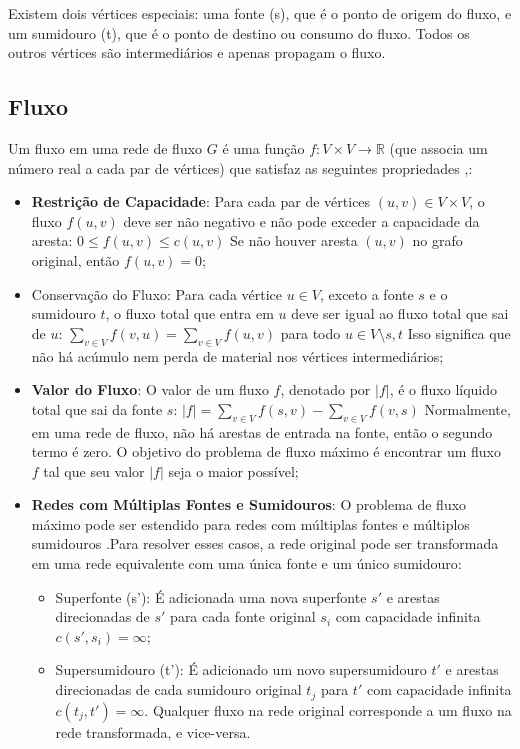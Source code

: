 \documentclass[12pt]{article}
\begin{document}
\noindent Existem dois vértices especiais: uma fonte (s), que é o ponto de origem do fluxo, e um sumidouro (t), que é o ponto de destino ou consumo do fluxo. Todos os outros vértices são intermediários e apenas propagam o fluxo.

\subsection{Fluxo} 

Um fluxo em uma rede de fluxo $G$ é uma função $f: V \times V \rightarrow \mathbb{R}$ (que associa um número real a cada par de vértices) que satisfaz as seguintes propriedades \cite{ahuja1993},:

\begin{itemize}
    \item \textbf{Restrição de Capacidade}: Para cada par de vértices $(u, v) \in V \times V$, o fluxo $f(u, v)$ deve ser não negativo e não pode exceder a capacidade da aresta: $0 \le f(u, v) \le c(u, v)$ Se não houver aresta $(u, v)$ no grafo original, então $f(u, v) = 0$;
    \item Conservação do Fluxo: Para cada vértice $u \in V$, exceto a fonte $s$ e o sumidouro $t$, o fluxo total que entra em $u$ deve ser igual ao fluxo total que sai de $u$: $\sum_{v \in V} f(v, u) = \sum_{v \in V} f(u, v)$ para todo $u \in V \setminus {s, t}$ Isso significa que não há acúmulo nem perda de material nos vértices intermediários;
    \item \textbf{Valor do Fluxo}: O valor de um fluxo $f$, denotado por $|f|$, é o fluxo líquido total que sai da fonte $s$: $|f| = \sum_{v \in V} f(s, v) - \sum_{v \in V} f(v, s)$ Normalmente, em uma rede de fluxo, não há arestas de entrada na fonte, então o segundo termo é zero. O objetivo do problema de fluxo máximo é encontrar um fluxo $f$ tal que seu valor $|f|$ seja o maior possível;
    \item \textbf{Redes com Múltiplas Fontes e Sumidouros}: O problema de fluxo máximo pode ser estendido para redes com múltiplas fontes e múltiplos sumidouros \cite{goldberg1988,ahuja1993}.Para resolver esses casos, a rede original pode ser transformada em uma rede equivalente com uma única fonte e um único sumidouro:
    \begin{itemize}
        \item Superfonte (s’): É adicionada uma nova superfonte $s'$ e arestas direcionadas de $s'$ para cada fonte original $s_i$ com capacidade infinita $c(s', s_i) = \infty$;
        \item Supersumidouro (t’): É adicionado um novo supersumidouro $t'$ e arestas direcionadas de cada sumidouro original $t_j$ para $t'$ com capacidade infinita $c(t_j, t') = \infty$. Qualquer fluxo na rede original corresponde a um fluxo na rede transformada, e vice-versa.

\end{itemize}
\end{itemize}
\end{document}
